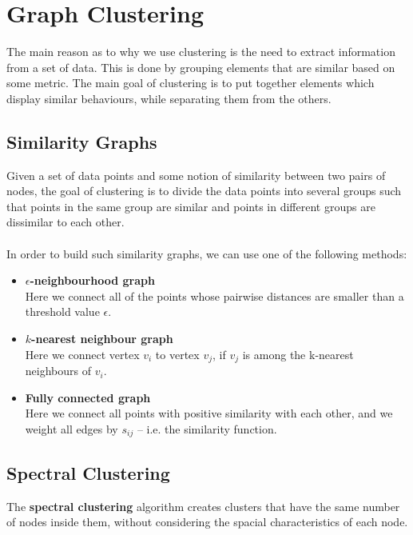 \documentclass{article}
\begin{document}
\section{Graph Clustering}
The main reason as to why we use clustering is the need to extract information from a set of data. This is done by grouping elements that are similar based on some metric. The main goal of clustering is to put together elements which display similar behaviours, while separating them from the others.

\subsection{Similarity Graphs}
Given a set of data points and some notion of similarity between two pairs of nodes, the goal of clustering is to divide the data points into several groups such that points in the same group are similar and points in different groups are dissimilar to each other. \\ \\
In order to build such similarity graphs, we can use one of the following methods:

\begin{itemize}
	\item \textbf{$\epsilon$-neighbourhood graph}
	\vspace{.2cm} \\
	Here we connect all of the points whose pairwise distances are smaller than a threshold value $\epsilon$.
	
	\item \textbf{$k$-nearest neighbour graph}
	\vspace{.2cm} \\
	Here we connect vertex $v_i$ to vertex $v_j$, if $v_j$ is among the k-nearest neighbours of $v_i$.
	
	\item \textbf{Fully connected graph}
	\vspace{.2cm} \\
	Here we connect all points with positive similarity with each other, and we weight all edges by $s_{ij}$ -- i.e. the similarity function.
\end{itemize}

\subsection{Spectral Clustering}
The \textbf{spectral clustering} algorithm creates clusters that have the same number of nodes inside them, without considering the spacial characteristics of each node.
\end{document}
